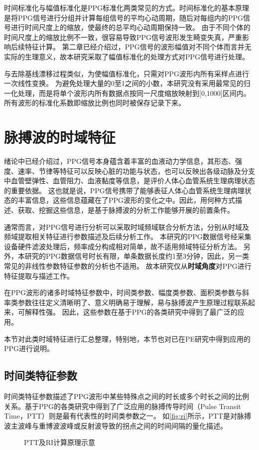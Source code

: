 时间标准化与幅值标准化是PPG标准化两类常见的方式\cite{mmt}。时间标准化的基本原理是将PPG信号进行分组并计算每组信号的平均心动周期，随后对每组内的PPG信号进行时间尺度上的缩放，使最终的总平均心动周期保持一致。
由于不同个体的时间尺度上的缩放比例不一致，很容易导致PPG信号波形发生畸变失真，严重影响后续特征计算。
第二章已经介绍过，PPG信号的波形幅值对不同个体而言并无实际的生理意义，故本研究采取了幅值标准化的处理方式对PPG信号进行处理。

与去除基线漂移过程类似，为使幅值标准化，只需对PPG波形内所有采样点进行一次线性变换。
为避免处理大量的0至1之间的小数，本研究没有采用最常见的归一化处理，而是将单个波形内所有数据点按同一尺度缩放映射到[0,1000]区间内。
所有波形的标准化系数即缩放比例也同时被保存记录下来。

\section{脉搏波的时域特征}
绪论中已经介绍过，PPG信号本身蕴含着丰富的血液动力学信息，其形态、强度、速率、节律等特征可以反映心脏的功能与状态，也可以反映出各级动脉及分支中血管壁弹性、血管阻力、血液黏度等信息，是评价人体心血管系统生理病理状态的重要依据\cite{PPGYY}。
这也就是说，PPG信号携带了能够表征人体心血管系统生理病理状态的丰富信息，这些信息蕴藏在了PPG波形的变化之中。因此，用何种方式描述、获取、挖掘这些信息，是基于脉搏波的分析工作能够开展的前置条件。

通常而言，对PPG信号进行分析可以采取时域频域联合分析方法，分别从时域及频域提取相关特征进行参数描述及后续分析工作。
本研究的PPG数据信号经采集设备硬件滤波处理后，频率成分构成相对简单，故不适用频域特征分析方法。
另外，本研究的PPG数据信号时长有限，单条数据长度约1至3分钟，因此，另一类常见的非线性参数特征参数的分析也不适用。
故本研究仅从\textbf{时域角度}对PPG进行特征提取与描述工作。

在PPG波形的诸多时域特征参数中，时间类参数、幅度类参数、面积类参数与斜率类参数往往定义清晰明了、意义明确易于理解，易与脉搏波产生原理过程联系起来，可解释性强。
因此，这些参数在基于PPG的各类研究中得到了最广泛的应用\cite{cwl,mmt}。

本节对此类时域特征进行汇总整理，特别地，本节也对已在PE研究中得到应用的PPG进行说明。

\subsection{时间类特征参数}
时间类特征参数描述了PPG波形中某些特殊点之间的时长或多个时长之间的比例关系。基于PPG的各类研究中得到了广泛应用的脉搏传导时间（Pulse Transit Time，PTT）则是最有代表性的时间类参数之一\cite{Brumfield2005,Su2014}。
如\autoref{fig:ri}所示，PTT是对脉搏波主波峰与重博波波峰或反射波导致的拐点之间的时间间隔的量化描述。
\begin{figure}[htbp]
    \centering
    \quad
    \caption[PTT及RI计算原理示意]{\label{fig:ri}PTT及RI计算原理示意\cite{Su2014}}
\end{figure}

